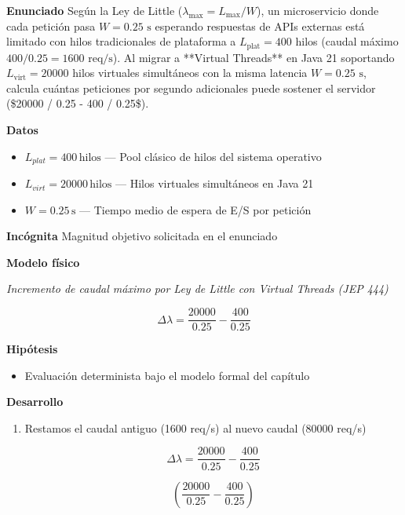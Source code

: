 \documentclass{book}
\begin{document}
\begin{tcolorbox}[title={Problema resuelto}, studiumworked, breakable]

\noindent\textbf{Enunciado}
Según la Ley de Little (\(\lambda_{\max} = L_{\max} / W\)), un microservicio donde cada petición pasa \(W = 0.25\text{ s}\) esperando respuestas de APIs externas está limitado con hilos tradicionales de plataforma a \(L_{\text{plat}} = 400\) hilos (caudal máximo \(400 / 0.25 = 1600\text{ req/s}\)). Al migrar a **Virtual Threads** en Java 21 soportando \(L_{\text{virt}} = 20000\) hilos virtuales simultáneos con la misma latencia \(W = 0.25\text{ s}\), calcula cuántas peticiones por segundo adicionales puede sostener el servidor (\$20000 / 0.25 - 400 / 0.25\$).

\noindent\textbf{Datos}
\begin{itemize}
\item $L_{plat} = 400\,\mathrm{hilos}$ — Pool clásico de hilos del sistema operativo
\item $L_{virt} = 20000\,\mathrm{hilos}$ — Hilos virtuales simultáneos en Java 21
\item $W = 0.25\,\mathrm{s}$ — Tiempo medio de espera de E/S por petición
\end{itemize}

\noindent\textbf{Incógnita}
Magnitud objetivo solicitada en el enunciado

\noindent\textbf{Modelo físico}

\noindent\textit{Incremento de caudal máximo por Ley de Little con Virtual Threads (JEP 444)}

\[
\Delta \lambda = \frac{20000}{0.25} - \frac{400}{0.25}
\]

\noindent\textbf{Hipótesis}
\begin{itemize}
\item Evaluación determinista bajo el modelo formal del capítulo
\end{itemize}

\noindent\textbf{Desarrollo}
\begin{enumerate}
\item
Restamos el caudal antiguo (1600 req/s) al nuevo caudal (80000 req/s)

\[
\Delta \lambda = \frac{20000}{0.25} - \frac{400}{0.25}
\]

\[
\left(\frac{20000}{0.25}-\frac{400}{0.25}\right)
\]
\end{enumerate}


\end{tcolorbox}
\end{document}
